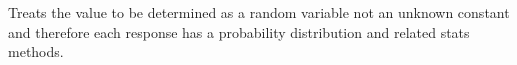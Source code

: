 \documentclass[11pt]{scrartcl} %
\begin{document}
Treats the value to be determined as a random variable not an unknown constant and therefore each response
has a probability distribution and related stats methods.

\newpage

\medskip

\printbibliography






\end{document}
